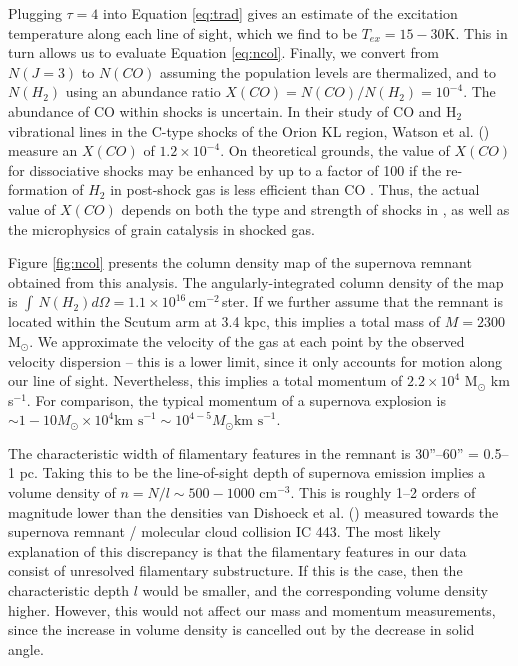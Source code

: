 Plugging $\tau=4$ into Equation \ref{eq:trad} gives an estimate of the excitation temperature along each line of sight, which we find to be $T_{ex} = 15-30$K. This in turn allows us to evaluate Equation \ref{eq:ncol}. Finally, we convert from $N(J=3)$ to $N(CO)$ assuming the population levels are thermalized, and to $N(H_2)$ using an abundance ratio $X(CO) = N(CO)/N(H_2)= 10^{-4}$. The abundance of CO within shocks is uncertain. In their study of CO and H$_2$ vibrational lines in the C-type shocks of the Orion KL region, Watson et al. (\citeyear{Watson85}) measure an $X(CO)$ of $1.2 \times 10^{-4}$. On theoretical grounds, the value of $X(CO)$ for dissociative shocks may be enhanced by up to a factor of 100 if the re-formation of $H_2$ in post-shock gas is less efficient than CO \citep{vanDishoeck92}. Thus, the actual value of $X(CO)$ depends on both the type and strength of shocks in \snr{}, as well as the microphysics of grain catalysis in shocked gas.

Figure \ref{fig:ncol} presents the column density map of the supernova remnant obtained from this analysis. The angularly-integrated column density of the map is $\int\,N(H_2) d\Omega = 1.1\times10^{16} $\,cm$^{-2}$\,ster. If we further assume that the remnant is located within the Scutum arm at 3.4 kpc, this implies a total mass of $M = 2300$ M$_\odot$. We approximate the velocity of the gas at each point by the observed velocity dispersion -- this is a lower limit, since it only accounts for motion along our line of sight. Nevertheless, this implies a total momentum of $2.2 \times 10^4$ M$_\odot$ km s$^{-1}$. For comparison, the typical momentum of a supernova explosion is $\sim 1-10 M_\odot \times 10^4 \text{km s}^{-1} \sim 10^{4-5} M_\odot \text{km s}^{-1}$.

The characteristic width of filamentary features in the remnant is 30''--60'' = 0.5--1 pc. Taking this to be the line-of-sight depth of supernova emission implies a volume density of $n = N / l \sim 500-1000$ cm$^{-3}$. This is roughly 1--2 orders of magnitude lower than the densities van Dishoeck et al. (\citeyear{vanDishoeck93}) measured towards the supernova remnant / molecular cloud collision IC 443. The most likely explanation of this discrepancy is that the filamentary features in our data consist of unresolved filamentary substructure. If this is the case, then the characteristic depth $l$ would be smaller, and the corresponding volume density higher. However, this would not affect our mass and momentum measurements, since the increase in volume density is cancelled out by the decrease in solid angle.

